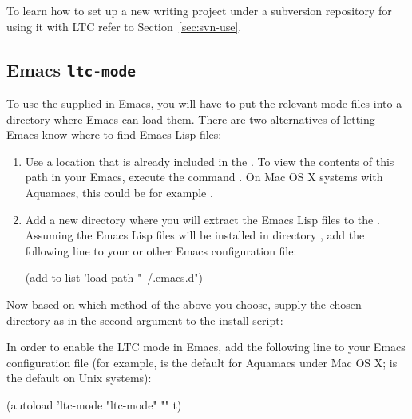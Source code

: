 To learn how to set up a new writing project under a subversion repository for using it with LTC refer to Section~\ref{sec:svn-use}.


\subsection{Emacs \texttt{ltc-mode}} \label{sec:config-emacs}

To use the supplied  in Emacs, you will have to put the relevant mode files into a directory where Emacs can load them. There are two alternatives of letting Emacs know where to find Emacs Lisp files:
\begin{enumerate}
\item Use a location that is already included in the . To view the contents of this path in your Emacs, execute the command .  On Mac OS X systems with Aquamacs, this could be for example .
\item Add a new directory where you will extract the Emacs Lisp files to the . Assuming the Emacs Lisp files will be installed in directory , add the following line to your  or other Emacs configuration file:
  \begin{CodeVerbatim}[frame=lines]
(add-to-list 'load-path "~/.emacs.d")
  \end{CodeVerbatim}
\end{enumerate}

Now based on which method of the above you choose, supply the chosen directory as  in the second argument to the install script:

In order to enable the LTC mode in Emacs, add the following line to your Emacs configuration file (for example,  is the default for Aquamacs under Mac OS X;  is the default on Unix systems):
\begin{CodeVerbatim}[frame=lines]
(autoload 'ltc-mode "ltc-mode" "" t)
\end{CodeVerbatim}

